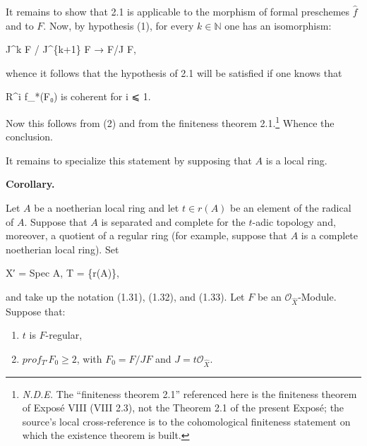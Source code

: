 \documentclass[
  11pt,
  a4paper,
]{book}
\newenvironment{Shaded}{}{}
\newcommand{\NormalTok}[1]{#1}
\begin{document}
It remains to show that 2.1 is applicable to the morphism of formal
preschemes \(\hat{f}\) and to \(F\). Now, by hypothesis (1), for every
\(k \in \mathbb{N}\) one has an isomorphism:

\begin{Shaded}
\begin{Highlighting}[]
\NormalTok{J\^{}k F / J\^{}\{k+1\} F → F/J F,}
\end{Highlighting}
\end{Shaded}

whence it follows that the hypothesis of 2.1 will be satisfied if one
knows that

\begin{Shaded}
\begin{Highlighting}[]
\NormalTok{R\^{}i f\_*(F₀) is coherent for i ⩽ 1.}
\end{Highlighting}
\end{Shaded}

Now this follows from (2) and from the finiteness theorem
2.1.\footnote{\emph{N.D.E.} The ``finiteness theorem 2.1'' referenced
  here is the finiteness theorem of Exposé VIII (VIII 2.3), not the
  Theorem 2.1 of the present Exposé; the source's local cross-reference
  is to the cohomological finiteness statement on which the existence
  theorem is built.} Whence the conclusion.

It remains to specialize this statement by supposing that \(A\) is a
local ring.

\textbf{Corollary.}

Let \(A\) be a noetherian local ring and let \(t \in r(A)\) be an
element of the radical of \(A\). Suppose that \(A\) is separated and
complete for the \(t\)-adic topology and, moreover, a quotient of a
regular ring (for example, suppose that \(A\) is a complete noetherian
local ring). Set

\begin{Shaded}
\begin{Highlighting}[]
\NormalTok{X′ = Spec A,    T = \{r(A)\},}
\end{Highlighting}
\end{Shaded}

and take up the notation (1.31), (1.32), and (1.33). Let \(F\) be an
\(\mathcal{O}_{\hat{X}}\)-Module. Suppose that:

\begin{enumerate}
\def\labelenumi{(\arabic{enumi})}
\item
  \(t\) is \(F\)-regular,
\item
  \(prof_{T'} F_{0} \geqslant 2\), with \(F_{0} = F/J F\) and
  \(J = t\mathcal{O}_{\hat{X}}\).
\end{enumerate}
\end{document}
